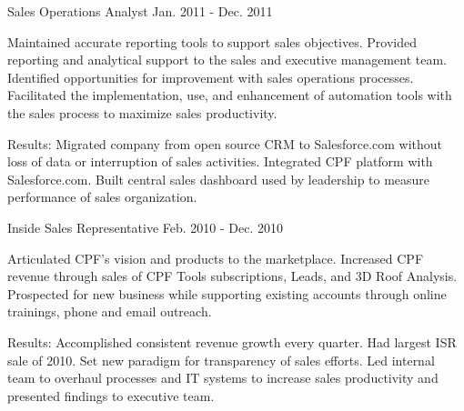 \begin{cventries}

\cventry
{Sales Operations Analyst} %
{} %
{} %
{Jan. 2011 - Dec. 2011} %
{ %
\begin{cvitems}
\item {Maintained accurate reporting tools to support sales objectives. Provided reporting and analytical support to the sales and executive management team. Identified opportunities for improvement with sales operations processes. Facilitated the implementation, use, and enhancement of automation tools with the sales process to maximize sales productivity.}
\end{cvitems}
}
\begin{cvitemsnb}
\item {Results: Migrated company from open source CRM to Salesforce.com without loss of data or interruption of sales activities. Integrated CPF platform with Salesforce.com. Built central sales dashboard used by leadership to measure performance of sales organization.}
\end{cvitemsnb}

\cventry
{Inside Sales Representative} %
{} %
{} %
{Feb. 2010 - Dec. 2010} %
{ %
\begin{cvitems}
\item {Articulated CPF’s vision and products to the marketplace. Increased CPF revenue through sales of CPF Tools subscriptions, Leads, and 3D Roof Analysis. Prospected for new business while supporting existing accounts through online trainings, phone and email outreach.} %
\end{cvitems}
}
\begin{cvitemsnb}
\item {Results: Accomplished consistent revenue growth every quarter. Had largest ISR sale of 2010. Set new paradigm for transparency of sales efforts. Led internal team to overhaul processes and IT systems to increase sales productivity and presented findings to executive team.}
\end{cvitemsnb}	



\end{cventries}
